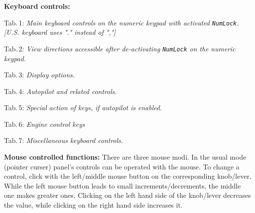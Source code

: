 \documentclass[10pt]{article}
\begin{document}
 \noindent
 \textbf{Keyboard controls:}
\begin{multicols}{2}
 \noindent
 Tab.\,1: \textit{Main keyboard controls on the numeric keypad with
 activated \texttt{NumLock}. [U.S. keyboard uses "." instead of ","]}\\

\noindent

\bigskip

 \noindent
 Tab.\,2: \textit{View directions accessible after de-activating \texttt{NumLock} on the numeric keypad.}
\medskip

 \noindent
 
\bigskip

 \noindent
 Tab.\,3: \textit{Display options.}
\medskip

 \noindent

\bigskip
\rule{0mm}{15mm}

 \noindent
 Tab.\,4: \textit{Autopilot and related controls.}
\medskip

\noindent

\medskip

 \noindent
Tab.\,5: \textit{Special action of keys, if autopilot is enabled.}
\medskip

 \noindent

\medskip


 \noindent
Tab.\,6: \textit{Engine control keys}
\medskip

 \noindent

\medskip

 \noindent
Tab.\,7: \textit{Miscellaneous keyboard controls.}
\medskip

 \noindent

\medskip


\end{multicols}

 \noindent
 \textbf{Mouse controlled functions:}
 There are three mouse modi. In the usual mode (pointer curser) panel's controls can be operated
 with the mouse. To change a control, click with the left/middle mouse button on the
 corresponding knob/lever. While the left mouse button leads to small increments/decrements,
 the middle one makes greater ones. Clicking on the left hand side of the knob/lever
 decreases the value, while clicking on the right hand side increases it.
\end{document}

